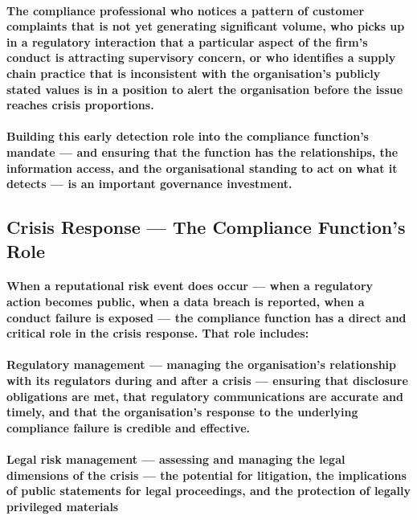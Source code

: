 \paragraph{The compliance professional who notices a pattern of customer complaints that is not yet generating significant volume, who picks up in a regulatory interaction that a particular aspect of the firm's conduct is attracting supervisory concern, or who identifies a supply chain practice that is inconsistent with the organisation's publicly stated values is in a position to alert the organisation before the issue reaches crisis proportions.}
\paragraph{Building this early detection role into the compliance function's mandate — and ensuring that the function has the relationships, the information access, and the organisational standing to act on what it detects — is an important governance investment.}

\subsection{Crisis Response — The Compliance Function's Role}
\paragraph{When a reputational risk event does occur — when a regulatory action becomes public, when a data breach is reported, when a conduct failure is exposed — the compliance function has a direct and critical role in the crisis response. That role includes:}
\paragraph{\textbf{Regulatory management} — managing the organisation's relationship with its regulators during and after a crisis — ensuring that disclosure obligations are met, that regulatory communications are accurate and timely, and that the organisation's response to the underlying compliance failure is credible and effective.}
\paragraph{\textbf{Legal risk management} — assessing and managing the legal dimensions of the crisis — the potential for litigation, the implications of public statements for legal proceedings, and the protection of legally privileged materials}
